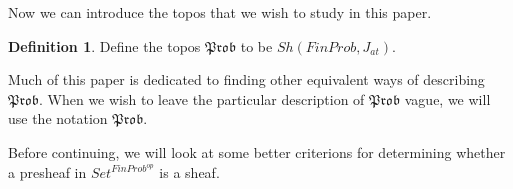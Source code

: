 \documentclass[a4paper]{amsproc}
\theoremstyle{plain}
\theoremstyle{definition}
\newtheorem{definition}[theorem]{Definition}
\theoremstyle{remark}
\numberwithin{equation}{section}
\begin{document}
Now we can introduce the topos that we wish to study in this paper.

\begin{definition}
Define the topos $\mathfrak{Prob}$ to be $Sh(FinProb, J_{at})$.
\end{definition}

Much of this paper is dedicated to finding other equivalent ways of describing $\mathfrak{Prob}$. When we wish to leave the particular description of $\mathfrak{Prob}$ vague, we will use the notation $\mathfrak{Prob}$.

Before continuing, we will look at some better criterions for determining whether a presheaf in $Set^{FinProb^{op}}$ is a sheaf.
\end{document}
